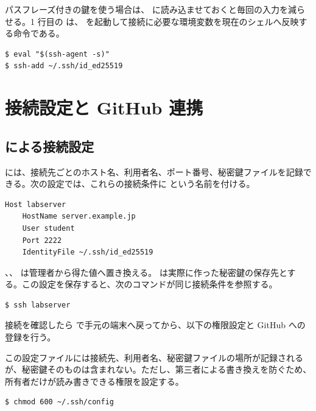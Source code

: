 パスフレーズ付きの鍵を使う場合は、 に読み込ませておくと毎回の入力を減らせる。1 行目の  は、 を起動して接続に必要な環境変数を現在のシェルへ反映する命令である。

\begin{lstlisting}[numbers=none, xleftmargin=2\zw]
$ eval "$(ssh-agent -s)"
$ ssh-add ~/.ssh/id_ed25519
\end{lstlisting}

\section{接続設定と GitHub 連携}

\subsection{ による接続設定}

 には、接続先ごとのホスト名、利用者名、ポート番号、秘密鍵ファイルを記録できる。次の設定では、これらの接続条件に  という名前を付ける。

\begin{lstlisting}[numbers=none, xleftmargin=2\zw, title={\textasciitilde/.ssh/config}]
Host labserver
    HostName server.example.jp
    User student
    Port 2222
    IdentityFile ~/.ssh/id_ed25519
\end{lstlisting}

、、 は管理者から得た値へ置き換える。 は実際に作った秘密鍵の保存先とする。この設定を保存すると、次のコマンドが同じ接続条件を参照する。

\begin{lstlisting}[numbers=none, xleftmargin=2\zw]
$ ssh labserver
\end{lstlisting}

接続を確認したら  で手元の端末へ戻ってから、以下の権限設定と GitHub への登録を行う。

この設定ファイルには接続先、利用者名、秘密鍵ファイルの場所が記録されるが、秘密鍵そのものは含まれない。ただし、第三者による書き換えを防ぐため、所有者だけが読み書きできる権限を設定する。

\begin{lstlisting}[numbers=none, xleftmargin=2\zw]
$ chmod 600 ~/.ssh/config
\end{lstlisting}

